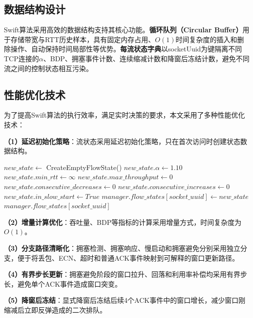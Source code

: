 \subsection{数据结构设计}

Swift算法采用高效的数据结构支持其核心功能。\textbf{循环队列（Circular Buffer）}用于存储带宽与RTT历史样本，具有固定内存占用、$O(1)$时间复杂度的插入和删除操作、自动保持时间局部性等优势。\textbf{每流状态字典}以socketUuid为键隔离不同TCP连接的$\alpha$、BDP、拥塞事件计数、连续缩减计数和降窗后冻结计数，避免不同流之间的控制状态相互污染。

\subsection{性能优化技术}

为了提高Swift算法的执行效率，满足实时决策的要求，本文采用了多种性能优化技术：

\textbf{（1）延迟初始化策略}：流状态采用延迟初始化策略，只在首次访问时创建状态数据结构。

\begin{algorithm}[htbp]
\caption{延迟初始化状态获取}
\begin{algorithmic}[1]
        \State $new\_state \leftarrow$ CreateEmptyFlowState()
        \State $new\_state.\alpha \leftarrow 1.10$
        \State $new\_state.min\_rtt \leftarrow \infty$
        \State $new\_state.max\_throughput \leftarrow 0$
        \State $new\_state.consecutive\_decreases \leftarrow 0$
        \State $new\_state.consecutive\_increases \leftarrow 0$
        \State $new\_state.in\_slow\_start \leftarrow True$
        \State $manager.flow\_states[socket\_uuid] \leftarrow new\_state$
    \EndIf
    \State \Return $manager.flow\_states[socket\_uuid]$
\EndFunction
\end{algorithmic}
\end{algorithm}

\textbf{（2）增量计算优化}：吞吐量、BDP等指标的计算采用增量方式，时间复杂度为$O(1)$。

\textbf{（3）分支路径清晰化}：拥塞检测、拥塞响应、慢启动和拥塞避免分别采用独立分支，便于将丢包、ECN、超时和普通ACK事件映射到可解释的窗口更新路径。

\textbf{（4）有界步长更新}：拥塞避免阶段的窗口拉升、回落和利用率补偿均采用有界步长，避免单个ACK事件造成窗口突变。

\textbf{（5）降窗后冻结}：显式降窗后冻结后续4个ACK事件中的窗口增长，减少窗口刚缩减后立即反弹造成的二次排队。

